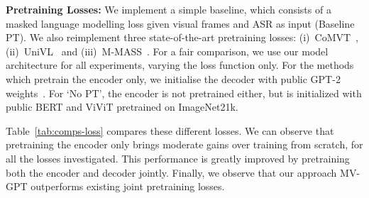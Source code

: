 \documentclass[10pt,twocolumn,letterpaper]{article}
\begin{document}
\begin{table}[t]
    \centering
    \caption{
    Comparisons to existing pretraining losses on YouCook2. 
    \textbf{PT} stands for pretraining. \textbf{PT parts} indicates which part of the model are pretrained, encoder (E) or both encoder and decoder (E + D).
    We reimplement the loss functions of existing methods but use our model and training strategies for fair comparison. 
    } 
    \label{tab:comps-loss}
\end{table}



\noindent\textbf{Pretraining Losses:} 
We implement a simple baseline, which consists of a masked language modelling loss given visual frames and ASR as input (Baseline PT). 
We also reimplement three state-of-the-art pretraining losses: (i)~CoMVT~\cite{seo2021look}, (ii)~UniVL~\cite{luo2020univl} and (iii)~M-MASS~\cite{huang2020multimodal}. For a fair comparison, we use our model architecture for all experiments, varying the loss function only. For the methods which pretrain the encoder only, we initialise the decoder with public GPT-2 weights~\cite{radford2019language}. 
For `No PT', the encoder is not pretrained either, but is initialized with public BERT and ViViT pretrained on ImageNet21k.

Table~\ref{tab:comps-loss} compares these different losses. We can observe that  pretraining the encoder only brings moderate gains over training from scratch, for all the losses investigated.
This performance is greatly improved by pretraining both the encoder and decoder jointly. Finally, we observe that our approach MV-GPT outperforms existing joint pretraining losses. 
\end{document}
